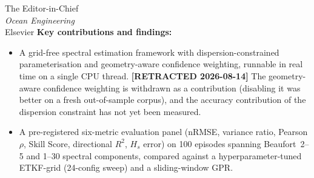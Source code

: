 \documentclass[11pt,a4paper]{letter}
\begin{document}
\begin{letter}{The Editor-in-Chief \\ \textit{Ocean Engineering} \\ Elsevier}
\textbf{Key contributions and findings:}
\begin{itemize}
  \item A grid-free spectral estimation framework with
        dispersion-constrained parameterisation and geometry-aware
        confidence weighting, runnable in real time on a single CPU
        thread.
        \textbf{[RETRACTED 2026-08-14]} The geometry-aware confidence
        weighting is withdrawn as a contribution (disabling it was better on
        a fresh out-of-sample corpus), and the accuracy contribution of the
        dispersion constraint has not yet been measured.
  \item A pre-registered six-metric evaluation panel
        (nRMSE, variance ratio, Pearson $\rho$, Skill Score,
        directional $R^2$, $H_s$ error) on 100 episodes spanning
        Beaufort~2--5 and 1--30 spectral components, compared against
        a hyperparameter-tuned ETKF-grid (24-config sweep) and a
        sliding-window GPR.

\end{itemize}
\end{letter}
\end{document}

